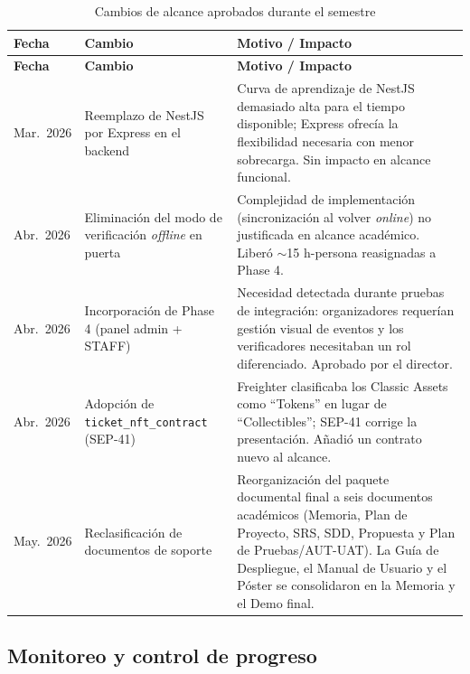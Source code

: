 \documentclass[12pt,oneside]{report}
\begin{document}
      \begin{longtable}{@{}p{2.0cm} p{6.0cm} p{6.6cm}@{}}
        \caption{Cambios de alcance aprobados durante el semestre}
        \label{tab:cambios-alcance}\\
        \toprule
        \textbf{Fecha} & \textbf{Cambio} & \textbf{Motivo / Impacto}\\
        \midrule
        \endfirsthead
        \toprule
        \textbf{Fecha} & \textbf{Cambio} & \textbf{Motivo / Impacto}\\
        \midrule
        \endhead
        \bottomrule
        \endfoot
        Mar.~2026 & Reemplazo de NestJS por Express en el backend & Curva de aprendizaje de NestJS demasiado alta para el tiempo disponible; Express ofrecía la flexibilidad necesaria con menor sobrecarga. Sin impacto en alcance funcional.\\
        Abr.~2026 & Eliminación del modo de verificación \textit{offline} en puerta & Complejidad de implementación (sincronización al volver \textit{online}) no justificada en alcance académico. Liberó $\sim$15 h-persona reasignadas a Phase 4.\\
        Abr.~2026 & Incorporación de Phase 4 (panel admin + STAFF) & Necesidad detectada durante pruebas de integración: organizadores requerían gestión visual de eventos y los verificadores necesitaban un rol diferenciado. Aprobado por el director.\\
        Abr.~2026 & Adopción de \texttt{ticket\_nft\_contract} (SEP-41) & Freighter clasificaba los Classic Assets como ``Tokens'' en lugar de ``Collectibles''; SEP-41 corrige la presentación. Añadió un contrato nuevo al alcance.\\
        May.~2026 & Reclasificación de documentos de soporte & Reorganización del paquete documental final a seis documentos académicos (Memoria, Plan de Proyecto, SRS, SDD, Propuesta y Plan de Pruebas/AUT-UAT). La Guía de Despliegue, el Manual de Usuario y el Póster se consolidaron en la Memoria y el Demo final.\\
      \end{longtable}

    \subsection{Monitoreo y control de progreso}
    \label{subsec:monitoreo-progreso}
\end{document}
